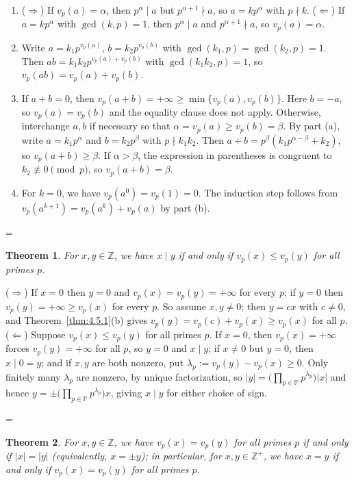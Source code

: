\documentclass[11pt]{article}
\makeatletter
\theoremstyle{ntstyle}
\newtheorem{theorem}{Theorem}[subsection]
\let\nt@closedisplay\]
\def\nt@guardedclose{\@ifnextchar\par{\nt@closeafterpar}{\@ifnextchar\end{\postdisplaypenalty\@M\nt@closedisplay}{\nt@closedisplay}}}
\def\nt@closeafterpar\par{\@ifnextchar\par{\nt@closeafterpar}{\@ifnextchar\end{\postdisplaypenalty\@M\nt@closedisplay\par}{\nt@closedisplay\par}}}
\renewenvironment{proof}[1][\proofname]{\par
  \pushQED{\qed}\normalfont\topsep\medskipamount\edef\nt@afterproof{\@endparpenalty=\the\@endparpenalty\relax}\@beginparpenalty\@M\@endparpenalty\@M\let\]\nt@guardedclose\trivlist\item[]\textit{#1\@addpunct{.}} \ignorespaces}{\ifvmode\addpenalty\@M\fi\popQED\nt@afterproof\endtrivlist\@endpefalse}
\newcommand{\Primes}{\mathbb{P}}
\makeatother
\begin{document}
\begin{proof}

	\begin{enumerate}[label={\alph*)}]
		\item ($\Rightarrow$) If $v_p(a) = \alpha$, then $p^{\alpha} \mid
			      a$ but $p^{\alpha+1} \nmid a$, so $a = k p^{\alpha}$ with $p \nmid
			      k$. ($\Leftarrow$) If $a = k p^{\alpha}$ with $\gcd(k, p) = 1$, then
		      $p^{\alpha} \mid a$ and $p^{\alpha+1} \nmid a$, so $v_p(a) = \alpha$.
		\item Write $a = k_1 p^{v_p(a)}$, $b = k_2 p^{v_p(b)}$ with
		      $\gcd(k_1, p) = \gcd(k_2, p) = 1$. Then $ab = k_1 k_2 p^{v_p(a) +
					      v_p(b)}$ with $\gcd(k_1 k_2, p) = 1$, so $v_p(ab) = v_p(a) + v_p(b)$.
		\item If $a+b=0$, then $v_p(a+b)=+\infty\ge\min\{v_p(a),v_p(b)\}$.
		      Here $b=-a$, so $v_p(a)=v_p(b)$ and the equality clause does not apply.
		      Otherwise, interchange $a,b$ if necessary so that
		      $\alpha=v_p(a)\ge v_p(b)=\beta$. By part (a), write
		      $a=k_1p^{\alpha}$ and $b=k_2p^{\beta}$ with $p\nmid k_1k_2$.
		      Then $a+b=p^{\beta}(k_1p^{\alpha-\beta}+k_2)$, so
		      $v_p(a+b)\ge\beta$. If $\alpha>\beta$, the expression in parentheses
		      is congruent to $k_2\not\equiv0\pmod p$, so $v_p(a+b)=\beta$.
		\item For $k=0$, we have $v_p(a^0)=v_p(1)=0$.
		      The induction step follows from
		      $v_p(a^{k+1})=v_p(a^k)+v_p(a)$ by part (b).\qedhere
	\end{enumerate}

\end{proof}
\begin{theorem}\label{thm:4.5.2} For $x, y \in \mathbb{Z}$, we have $x \mid y$ if and only if $v_p(x) \le v_p(y)$
	for all primes $p$.

\end{theorem}

\begin{proof} ($\Rightarrow$) If $x=0$ then $y=0$ and
	$v_p(x)=v_p(y)=+\infty$ for every $p$; if $y=0$ then
	$v_p(y)=+\infty\ge v_p(x)$ for every $p$. So assume $x,y\neq0$; then
	$y=cx$ with $c\neq0$, and Theorem~\ref{thm:4.5.1}(b) gives
	$v_p(y)=v_p(c)+v_p(x)\ge v_p(x)$ for all $p$.
	($\Leftarrow$) Suppose $v_p(x) \le v_p(y)$ for all primes $p$. If $x = 0$, then $v_p(x) = +\infty$ forces $v_p(y) = +\infty$ for all $p$, so $y = 0$ and $x \mid y$; if $x \neq 0$ but $y = 0$, then $x \mid 0 = y$; and if $x,y$ are both nonzero, put $\lambda_p:=v_p(y)-v_p(x)\ge0$.
	Only finitely many $\lambda_p$ are nonzero, by unique factorization, so $|y| = \big(\prod_{p\in\Primes} p^{\lambda_p}\big)|x|$ and hence $y = \pm\big(\prod_{p\in\Primes} p^{\lambda_p}\big) x$, giving $x \mid y$ for either choice of sign.

\end{proof}
\begin{theorem}\label{thm:4.5.3} For $x, y \in \mathbb{Z}$, we have $v_p(x) = v_p(y)$ for all primes $p$ if and only if $|x| = |y|$ (equivalently, $x = \pm y$); in particular, for $x, y \in \mathbb{Z}^+$, we have $x = y$ if and only if $v_p(x) = v_p(y)$ for all primes $p$.

\end{theorem}
\end{document}
